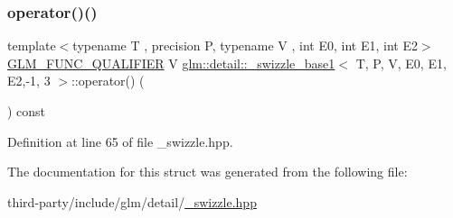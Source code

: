 \subsubsection{\texorpdfstring{operator()()}{operator()()}}
{\footnotesize\ttfamily template$<$typename T , precision P, typename V , int E0, int E1, int E2$>$ \\
\hyperlink{setup_8hpp_a33fdea6f91c5f834105f7415e2a64407}{G\+L\+M\+\_\+\+F\+U\+N\+C\+\_\+\+Q\+U\+A\+L\+I\+F\+I\+ER} V \hyperlink{structglm_1_1detail_1_1__swizzle__base1}{glm\+::detail\+::\+\_\+swizzle\+\_\+base1}$<$ T, P, V, E0, E1, E2,-\/1, 3 $>$\+::operator() (\begin{DoxyParamCaption}{ }\end{DoxyParamCaption}) const\hspace{0.3cm}{\ttfamily [inline]}}



Definition at line 65 of file \+\_\+swizzle.\+hpp.



The documentation for this struct was generated from the following file\+:\begin{DoxyCompactItemize}
\item 
third-\/party/include/glm/detail/\hyperlink{__swizzle_8hpp}{\+\_\+swizzle.\+hpp}\end{DoxyCompactItemize}
